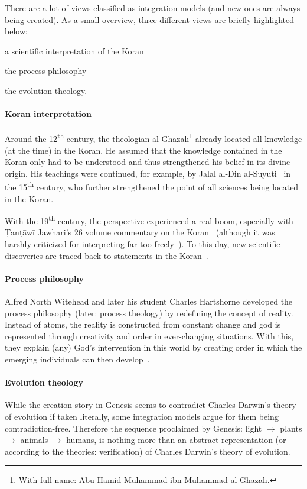 There are a lot of views classified as integration models (and new ones are always being created). As a small overview, three different views are briefly highlighted below: \begin{inlist}
    \item a scientific interpretation of the Koran
    \item the process philosophy
    \item the evolution theology.
\end{inlist}


\paragraph{Koran interpretation}
Around the 12\textsuperscript{th} century, the theologian al-Ghazālī\footnote{With full name: Abū Hāmid Muhammad ibn Muhammad al-Ghazālī.} already located all knowledge (at the time) in the Koran.
He assumed that the knowledge contained in the Koran only had to be understood and thus strengthened his belief in its divine origin.
His teachings were continued, for example, by Jalal al-Din al-Suyuti~\cite{abdurrahman2003kecsfu} in the 15\textsuperscript{th} century, who further strengthened the point of all sciences being located in the Koran.

With the 19\textsuperscript{th} century, the perspective experienced a real boom, especially with \d{T}an\d{t}āwī Jawhari's 26 volume commentary on the Koran~\cite{jawhari1932jawahir} (although it was harshly criticized for interpreting far too freely~\cite[p.~48]{Demirci2016}).
To this day, new scientific discoveries are traced back to statements in the Koran~\cite{Demirci2016}.

\paragraph{Process philosophy}
Alfred North Witehead and later his student Charles Hartshorne developed the process philosophy (later: process theology) by redefining the concept of reality.
Instead of atoms, the reality is constructed from constant change
and god is represented through creativity and order in ever-changing situations.
With this, they explain (any) God's intervention in this world by creating order in which the emerging individuals can then develop~\cite{whitehead1957process}.


\paragraph{Evolution theology}
While the creation story in Genesis seems to contradict Charles Darwin's theory of evolution if taken literally, some integration models argue for them being contradiction-free.
{\def\mto{\(\to\)}
Therefore the sequence proclaimed by Genesis: light \mto{} plants \mto{} animals \mto{} humans, is nothing more than an abstract representation (or according to the theories: verification) of Charles Darwin's theory of evolution.
}

